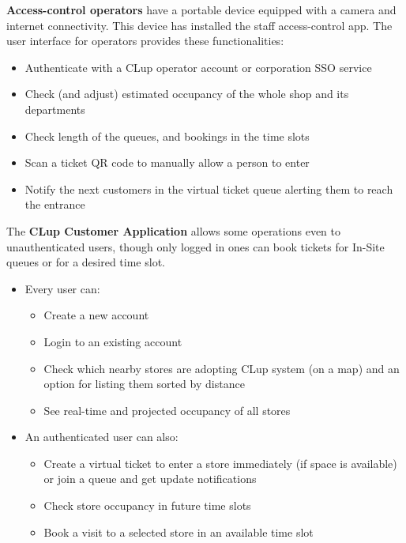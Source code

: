 \textbf{Access-control operators} have a portable device equipped with a camera and internet connectivity. This device has installed the staff access-control app. The user interface for operators provides these functionalities:
\begin{itemize}
    \item Authenticate with a CLup operator account or corporation SSO service
    \item Check (and adjust) estimated occupancy of the whole shop and its departments
    \item Check length of the queues, and bookings in the time slots
    \item Scan a ticket QR code to manually allow a person to enter
    \item Notify the next customers in the virtual ticket queue alerting them to reach the entrance
\end{itemize}

The \textbf{CLup Customer Application} allows some operations even to unauthenticated users, though only logged in ones can book tickets for In-Site queues or for a desired time slot.
\begin{itemize}
    \item Every user can:
          \begin{itemize}
              \item Create a new account
              \item Login to an existing account
              \item Check which nearby stores are adopting CLup system (on a map) and an option for listing them sorted by distance
              \item See real-time and projected occupancy of all stores
          \end{itemize}
    \item An authenticated user can also:
          \begin{itemize}
              \item Create a virtual ticket to enter a store immediately (if space is available) or join a queue and get update notifications
              \item Check store occupancy in future time slots
              \item Book a visit to a selected store in an available time slot
          \end{itemize}
\end{itemize}

\vfill

